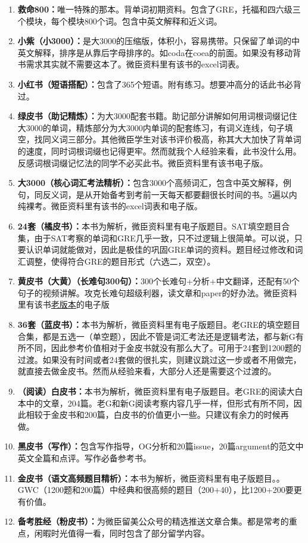 \documentclass[cn,plain]{./src/qyxfbook}
\newcommand{\red}[1]{\textcolor[rgb]{1,0,0}{#1}}
\newcommand{\bluea}[1]{\textcolor[rgb]{0,0.69,0.941}{#1}}
\begin{document}
\begin{enumerate}
    \item \textbf{救命800：}唯一特殊的那本。背单词初期资料。包含了GRE，托福和四六级三个模块，每个模块800个词。包含中英文解释和近义词。    
    \item \textbf{小紫（小3000）：}是大3000的压缩版，体积小，容易携带。只保留了单词的中英文解释，排序是从靠后字母排序的。如coda在coea的前面。如果没有移动背书需求其实就不需要这本了。\red{微臣资料里有该书的excel词表。}   
    \item \textbf{小红书（短语搭配）：}包含了365个短语。附有练习。想要冲高分的话此书必背过。    
    \item \textbf{绿皮书（助记精炼）：}为大3000配套书籍。助记部分讲解如何用词根词缀记住大3000的单词，精炼部分为大3000内单词的配套练习，有词义连线，句子填空，找同义词三部分。其他微臣学生对该书评价极高，称其大大加快了背单词的速度，同时词根词缀也记得更牢。然而就我个人经验来看，此书没什么用。反感词根词缀记忆法的同学不必买此书。\red{微臣资料里有该书电子版。}    
    \item \textbf{大3000（核心词汇考法精析）：}包含3000个高频词汇，包含中英文解释，例句，同反义词，是从开始备考到考前一天每天都要翻很长时间的书。5遍以内纯裸考。\red{微臣资料里有该书的excel词表和电子版}。
    \item \textbf{24套（橘皮书）：}\bluea{本书为解析，微臣资料里有电子版题目。}SAT填空题目合集，由于SAT考察的单词和GRE几乎一致，只不过逻辑上很简单。可以说，只要认识单词就能做对，因此是极佳的巩固GRE单词的资料。题目经过修改和词汇调整，使得符合GRE的题目形式（六选二，双空）。    
    \item \textbf{黄皮书（大黄）（长难句300句）：}300个长难句+分析+中文翻译，还配有50个句子的视频讲解。攻克长难句超级利器，读文章和paper的好办法。\red{微臣资料里有该书\underline{老版本}的电子版}
    \item \textbf{36套（蓝皮书）：}\bluea{本书为解析，微臣资料里有电子版题目。}老GRE的填空题目合集，都是五选一（单空题），因此不管是词汇考法还是逻辑考法，都与新G有所不同，因此参考价值相对于金皮书就没有那么大了。可用于24套到1200题的过渡。如果没有时间或者24套做的很扎实，则建议跳过这一步或者不用做完，就直接去做金皮书。然而从经验来看，大部分人还是需要这个过渡的。    
    \item \textbf{（阅读）白皮书：}本书为解析，微臣资料里有电子版题目。老GRE的阅读大白本中的文章，204篇。老G和新G阅读考察内容几乎一样，但形式有所不同，因此相较于金皮书和200篇，白皮书的价值更小一些。只建议有余力的时候再做。    
    \item \textbf{黑皮书（写作）：}包含写作指导，OG分析和20篇issue，20篇argument的范文中英文全篇和点评。写作必备参考书。    
    \item \textbf{金皮书（语文高频题目精析）：}\bluea{本书为解析，微臣资料里有电子版题目。}。GWC（1200题和200篇）中经典和很高频的题目（200+40），比1200+200要更有价值。    
    \item \textbf{备考胜经（粉皮书）：}为微臣留美公众号的精选推送文章合集。都是常考的重点，闲暇时光值得一看，同时包含了部分留学内容。
\end{enumerate}
\end{document}
